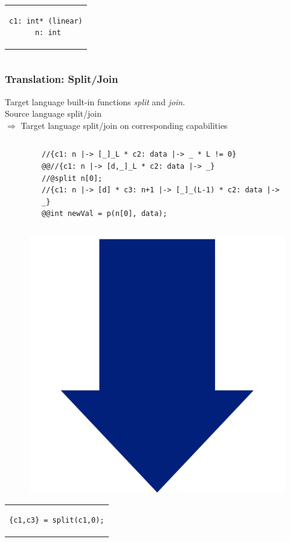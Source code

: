 \documentclass{beamer}
\begin{document}
\begin{frame}[fragile]
\begin{columns}
\begin{column}{0.4\textwidth}
\begin{center}
\begin{tabular}{c}
\begin{lstlisting}[style=CStyleNoNum, captionpos = t]
c1: int* (linear)
 n: int
\end{lstlisting}
\end{tabular}
\end{center}

\end{column}
\end{columns}
\end{frame}

\begin{frame}[fragile]
\frametitle{Translation: Split/Join}
Target language built-in functions \emph{split} and \emph{join}.\\
Source language split/join\\
$\Rightarrow$ Target language split/join on corresponding capabilities
\vspace{-1em}

\begin{columns}
\begin{column}{0.15\textwidth}
\end{column}
\begin{column}{0.90\textwidth}
\begin{figure}[h]
  \centering
\begin{lstlisting}[style=CStyleOverlay, captionpos = t, firstnumber = 9]
//{c1: n |-> [_]_L * c2: data |-> _ * L != 0}
@@//{c1: n |-> [d,_]_L * c2: data |-> _}
//@split n[0];
//{c1: n |-> [d] * c3: n+1 |-> [_]_(L-1) * c2: data |-> _}
@@int newVal = p(n[0], data);
\end{lstlisting}
\end{figure}
\end{column}
\end{columns}

\vspace{-.5em}
\begin{figure}[h]
\includegraphics[width=0.07\linewidth]{BlueArrowVertical}
\end{figure}
\vspace{-2em}

\begin{center}
\begin{tabular}{c}
\begin{lstlisting}[style=CStyleNoNum, captionpos = t]
{c1,c3} = split(c1,0);
\end{lstlisting}
\end{tabular}
\end{center}
\end{frame}
\end{document}
